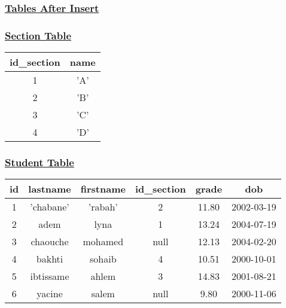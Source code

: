 \subsubsection*{\underline{\textbf{Tables After Insert}}}

\subsubsection*{\underline{\textbf{Section Table}}}

\begin{center}

 \renewcommand{\arraystretch}{1.5}
    \begin{tabular}{|c|c|}
        \hline 
        id\_section & name \\
        \hline
        1 & 'A'\\
        \hline
        2 & 'B'\\
        \hline
        3 & 'C'\\
        \hline
        4 & 'D'\\
        \hline
    \end{tabular}
\end{center}

\subsubsection*{\underline{\textbf{Student Table}}}
\begin{center}

 \renewcommand{\arraystretch}{1.5}
    \begin{tabular}{|c|c|c|c|c|c|}
        \hline
        id & lastname & firstname & id\_section & grade & dob\\
        \hline
        1 & 'chabane' & 'rabah' & 2 & 11.80 & 2002-03-19 \\
        \hline
        2 & adem & lyna & 1 & 13.24 & 2004-07-19\\
        \hline
        3 & chaouche & mohamed & null & 12.13 & 2004-02-20 \\
        \hline    
        4 & bakhti & sohaib & 4 & 10.51 & 2000-10-01 \\
        \hline    
        5 & ibtissame & ahlem & 3 & 14.83 & 2001-08-21 \\
        \hline 
        6 & yacine & salem & null & 9.80 & 2000-11-06 \\
        \hline
    \end{tabular}
\end{center}




